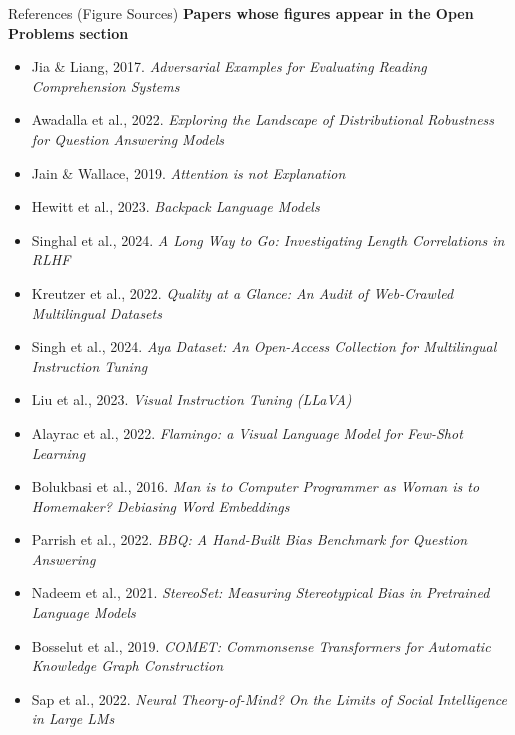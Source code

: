 \begin{frame}[t]{References (Figure Sources)}
    \textbf{Papers whose figures appear in the Open Problems section}
    \scriptsize
    \begin{itemize}
        \setlength{\itemsep}{0pt}
        \setlength{\parskip}{0pt}
        \item[\textcolor{red}{$\triangleright$}] Jia \& Liang, 2017. \textit{Adversarial Examples for Evaluating Reading Comprehension Systems}
        \item[\textcolor{red}{$\triangleright$}] Awadalla et al., 2022. \textit{Exploring the Landscape of Distributional Robustness for Question Answering Models}
        \item[\textcolor{red}{$\triangleright$}] Jain \& Wallace, 2019. \textit{Attention is not Explanation}
        \item[\textcolor{red}{$\triangleright$}] Hewitt et al., 2023. \textit{Backpack Language Models}
        \item[\textcolor{red}{$\triangleright$}] Singhal et al., 2024. \textit{A Long Way to Go: Investigating Length Correlations in RLHF}
        \item[\textcolor{red}{$\triangleright$}] Kreutzer et al., 2022. \textit{Quality at a Glance: An Audit of Web-Crawled Multilingual Datasets}
        \item[\textcolor{red}{$\triangleright$}] Singh et al., 2024. \textit{Aya Dataset: An Open-Access Collection for Multilingual Instruction Tuning}
        \item[\textcolor{red}{$\triangleright$}] Liu et al., 2023. \textit{Visual Instruction Tuning (LLaVA)}
        \item[\textcolor{red}{$\triangleright$}] Alayrac et al., 2022. \textit{Flamingo: a Visual Language Model for Few-Shot Learning}
        \item[\textcolor{red}{$\triangleright$}] Bolukbasi et al., 2016. \textit{Man is to Computer Programmer as Woman is to Homemaker? Debiasing Word Embeddings}
        \item[\textcolor{red}{$\triangleright$}] Parrish et al., 2022. \textit{BBQ: A Hand-Built Bias Benchmark for Question Answering}
        \item[\textcolor{red}{$\triangleright$}] Nadeem et al., 2021. \textit{StereoSet: Measuring Stereotypical Bias in Pretrained Language Models}
        \item[\textcolor{red}{$\triangleright$}] Bosselut et al., 2019. \textit{COMET: Commonsense Transformers for Automatic Knowledge Graph Construction}
        \item[\textcolor{red}{$\triangleright$}] Sap et al., 2022. \textit{Neural Theory-of-Mind? On the Limits of Social Intelligence in Large LMs}
    \end{itemize}
\end{frame}
